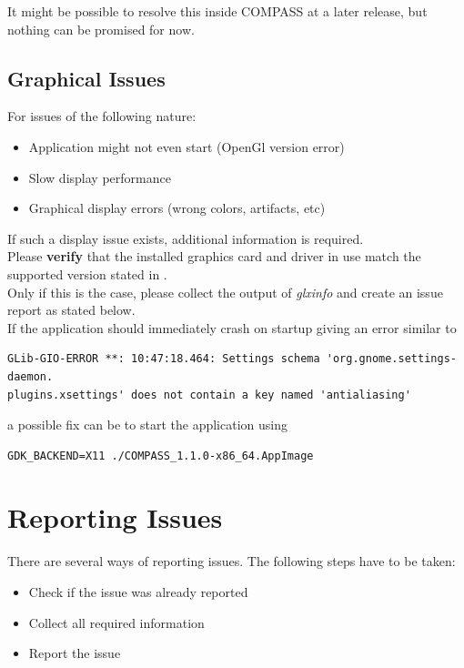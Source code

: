 It might be possible to resolve this inside COMPASS at a later release, but nothing can be promised for now.

\subsection{Graphical Issues}

For issues of the following nature:

\begin{itemize} 
\item Application might not even start (OpenGl version error)
\item Slow display performance
\item Graphical display errors (wrong colors, artifacts, etc)
\end{itemize} 

If such a display issue exists, additional information is required. \\

Please \textbf{verify} that the installed graphics card and driver in use match the supported version stated in . \\

Only if this is the case, please collect the output of \textit{glxinfo} and create an issue report as stated below. \\

If the application should immediately crash on startup giving an error similar to

\begin{verbatim}
GLib-GIO-ERROR **: 10:47:18.464: Settings schema 'org.gnome.settings-daemon.
plugins.xsettings' does not contain a key named 'antialiasing'
\end{verbatim}

a possible fix can be to start the application using 

\begin{verbatim}
GDK_BACKEND=X11 ./COMPASS_1.1.0-x86_64.AppImage
\end{verbatim}

\section{Reporting Issues}

There are several ways of reporting issues. The following steps have to be taken:

\begin{itemize}  
\item Check if the issue was already reported
\item Collect all required information
\item Report the issue
\end{itemize} 

